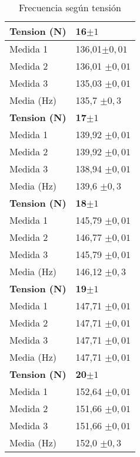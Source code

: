 \documentclass[a4paper,12pt,spanish]{article}
\begin{document}
\begin{table}[H]
\begin{minipage}[t]{.48\linewidth}
	\end{minipage}\hfill
	\mbox{}
	\begin{minipage}[t]{.48\linewidth}%
		\centering
		\begin{tabular}{|l|l|}
			\hline
			\textbf{Tension (N)} & \textbf{16}$\pm 1$ \\ \hline
			Medida 1    & 136,01$\pm 0,01$      \\ \hline
			Medida 2    & 136,01 $\pm 0,01$     \\ \hline
			Medida 3    & 135,03 $\pm 0,01$     \\ \hline
			Media (Hz)   & 135,7 $\pm 0,3$       \\ \hline\hline
			\textbf{Tension (N)} & \textbf{17}$\pm 1$ \\ \hline
			Medida 1    & 139,92 $\pm 0,01$     \\ \hline
			Medida 2    & 139,92 $\pm 0,01$     \\ \hline
			Medida 3    & 138,94 $\pm 0,01$     \\ \hline
			Media (Hz)   & 139,6 $\pm 0,3$       \\ \hline\hline
			\textbf{Tension (N)} & \textbf{18}$\pm 1$ \\ \hline
			Medida 1    & 145,79 $\pm 0,01$     \\ \hline
			Medida 2    & 146,77 $\pm 0,01$     \\ \hline
			Medida 3    & 145,79  $\pm 0,01$    \\ \hline
			Media (Hz)   & 146,12  $\pm 0,3$      \\ \hline\hline
		\textbf{Tension (N)} & \textbf{19}$\pm 1$ \\ \hline
			Medida 1    & 147,71 $\pm 0,01$     \\ \hline
			Medida 2    & 147,71 $\pm 0,01$     \\ \hline
			Medida 3    & 147,71  $\pm 0,01$    \\ \hline
			Media (Hz)   & 147,71 $\pm 0,01$       \\ \hline\hline
			\textbf{Tension (N)} & \textbf{20}$\pm 1$ \\ \hline
			Medida 1    & 152,64 $\pm 0,01$     \\ \hline
			Medida 2    & 151,66 $\pm 0,01$     \\ \hline
			Medida 3    & 151,66 $\pm 0,01$     \\ \hline
			Media (Hz)   & 152,0 $\pm 0,3 $       \\ \hline
		\end{tabular}
		
	\end{minipage}\hfill
	\mbox{}
	\caption{Frecuencia según tensión}
\end{table}
\end{document}
